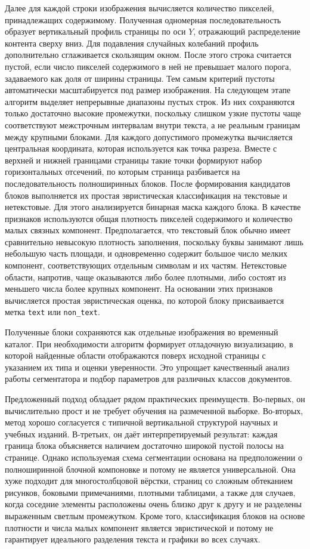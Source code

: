 Далее для каждой строки изображения вычисляется количество пикселей, принадлежащих содержимому. Полученная одномерная последовательность образует вертикальный профиль страницы по оси $Y$, отражающий распределение контента сверху вниз. Для подавления случайных колебаний профиль дополнительно сглаживается скользящим окном. После этого строка считается пустой, если число пикселей содержимого в ней не превышает малого порога, задаваемого как доля от ширины страницы. Тем самым критерий пустоты автоматически масштабируется под размер изображения.
На следующем этапе алгоритм выделяет непрерывные диапазоны пустых строк. Из них сохраняются только достаточно высокие промежутки, поскольку слишком узкие пустоты чаще соответствуют межстрочным интервалам внутри текста, а не реальным границам между крупными блоками. Для каждого допустимого промежутка вычисляется центральная координата, которая используется как точка разреза. Вместе с верхней и нижней границами страницы такие точки формируют набор горизонтальных отсечений, по которым страница разбивается на последовательность полноширинных блоков.
После формирования кандидатов блоков выполняется их простая эвристическая классификация на текстовые и нетекстовые. Для этого анализируется бинарная маска каждого блока. В качестве признаков используются общая плотность пикселей содержимого и количество малых связных компонент. Предполагается, что текстовый блок обычно имеет сравнительно невысокую плотность заполнения, поскольку буквы занимают лишь небольшую часть площади, и одновременно содержит большое число мелких компонент, соответствующих отдельным символам и их частям. Нетекстовые области, напротив, чаще оказываются либо более плотными, либо состоят из меньшего числа более крупных компонент. На основании этих признаков вычисляется простая эвристическая оценка, по которой блоку присваивается метка \texttt{text} или \texttt{non\_text}.

Полученные блоки сохраняются как отдельные изображения во временный каталог. При необходимости алгоритм формирует отладочную визуализацию, в которой найденные области отображаются поверх исходной страницы с указанием их типа и оценки уверенности. Это упрощает качественный анализ работы сегментатора и подбор параметров для различных классов документов.

Предложенный подход обладает рядом практических преимуществ. Во-первых, он вычислительно прост и не требует обучения на размеченной выборке. Во-вторых, метод хорошо согласуется с типичной вертикальной структурой научных и учебных изданий. В-третьих, он даёт интерпретируемый результат: каждая граница блока объясняется наличием достаточно широкой пустой полосы на странице.
Однако используемая схема сегментации основана на предположении о полноширинной блочной компоновке и потому не является универсальной. Она хуже подходит для многостолбцовой вёрстки, страниц со сложным обтеканием рисунков, боковыми примечаниями, плотными таблицами, а также для случаев, когда соседние элементы расположены очень близко друг к другу и не разделены выраженным светлым промежутком. Кроме того, классификация блоков на основе плотности и числа малых компонент является эвристической и потому не гарантирует идеального разделения текста и графики во всех случаях.

